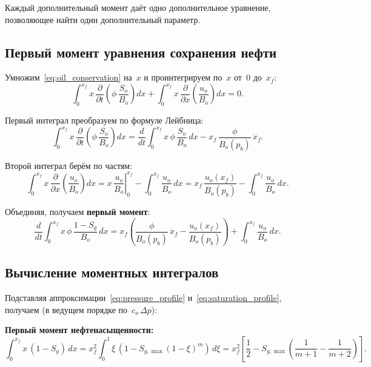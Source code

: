 \documentclass[12pt,a4paper]{article}
\begin{document}
Каждый дополнительный момент даёт одно дополнительное уравнение,
позволяющее найти один дополнительный параметр.

\subsection{Первый момент уравнения сохранения нефти}

Умножим~\eqref{eq:oil_conservation} на~$x$ и проинтегрируем
по~$x$ от~$0$ до~$x_f$:
\begin{equation}\label{eq:first_moment_oil}
  \int_0^{x_f} x\,\frac{\partial}{\partial t}
  \left(\phi\,\frac{S_o}{B_o}\right)dx
  + \int_0^{x_f} x\,\frac{\partial}{\partial x}
  \left(\frac{u_o}{B_o}\right)dx = 0.
\end{equation}

Первый интеграл преобразуем по формуле Лейбница:
\begin{equation}\label{eq:first_moment_leibniz}
  \int_0^{x_f} x\,\frac{\partial}{\partial t}
  \left(\phi\,\frac{S_o}{B_o}\right)dx
  = \frac{d}{dt}\int_0^{x_f} x\,\phi\,\frac{S_o}{B_o}\,dx
  - x_f\,\frac{\phi}{B_o(p_b)}\,\dot{x}_f.
\end{equation}

Второй интеграл берём по частям:
\begin{equation}\label{eq:first_moment_parts}
  \int_0^{x_f} x\,\frac{\partial}{\partial x}
  \left(\frac{u_o}{B_o}\right)dx
  = \left.x\,\frac{u_o}{B_o}\right|_0^{x_f}
  - \int_0^{x_f}\frac{u_o}{B_o}\,dx
  = x_f\,\frac{u_o(x_f)}{B_o(p_b)}
  - \int_0^{x_f}\frac{u_o}{B_o}\,dx.
\end{equation}

Объединяя, получаем \textbf{первый момент}:
\begin{equation}\label{eq:moment1_oil}
  \boxed{
  \frac{d}{dt}\int_0^{x_f} x\,\phi\,\frac{1-S_g}{B_o}\,dx
  = x_f\left(\frac{\phi}{B_o(p_b)}\,\dot{x}_f
  - \frac{u_o(x_f)}{B_o(p_b)}\right)
  + \int_0^{x_f}\frac{u_o}{B_o}\,dx.
  }
\end{equation}

\subsection{Вычисление моментных интегралов}

Подставляя аппроксимации~\eqref{eq:pressure_profile}
и~\eqref{eq:saturation_profile}, получаем (в ведущем порядке
по~$c_o\,\Delta p$):

\textbf{Первый момент нефтенасыщенности:}
\begin{equation}\label{eq:x_So_integral}
  \int_0^{x_f} x\,(1-S_g)\,dx
  = x_f^2\int_0^1 \xi\,(1 - S_{g,\max}(1-\xi)^m)\,d\xi
  = x_f^2\left[\frac{1}{2}
  - S_{g,\max}\left(\frac{1}{m+1} - \frac{1}{m+2}\right)\right].
\end{equation}
\end{document}
